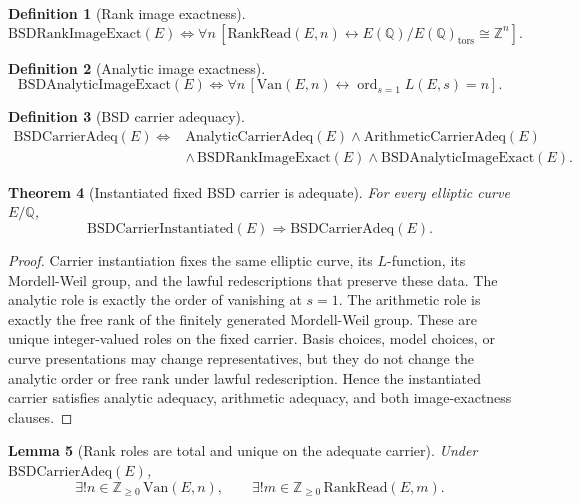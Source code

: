 \documentclass[11pt]{article}
\newtheorem{theorem}{Theorem}[section]
\newtheorem{lemma}[theorem]{Lemma}
\newtheorem{definition}[theorem]{Definition}
\newcommand{\Q}{\mathbb{Q}}
\newcommand{\Z}{\mathbb{Z}}
\newcommand{\ord}{\operatorname{ord}}
\newcommand{\tors}{\operatorname{tors}}
\newcommand{\Van}{\mathrm{Van}}
\newcommand{\RankRead}{\mathrm{RankRead}}
\begin{document}
\begin{definition}[Rank image exactness]
\[
\mathrm{BSDRankImageExact}(E)
\Longleftrightarrow
\forall n\,[\RankRead(E,n)\leftrightarrow E(\Q)/E(\Q)_{\tors}\cong\Z^n].
\]
\end{definition}

\begin{definition}[Analytic image exactness]
\[
\mathrm{BSDAnalyticImageExact}(E)
\Longleftrightarrow
\forall n\,[\Van(E,n)\leftrightarrow \ord_{s=1}L(E,s)=n].
\]
\end{definition}

\begin{definition}[BSD carrier adequacy]
\[
\begin{aligned}
\mathrm{BSDCarrierAdeq}(E) \Longleftrightarrow{}&
\mathrm{AnalyticCarrierAdeq}(E)\wedge
\mathrm{ArithmeticCarrierAdeq}(E)\\
&\wedge\,\mathrm{BSDRankImageExact}(E)
\wedge \mathrm{BSDAnalyticImageExact}(E).
\end{aligned}
\]
\end{definition}

\begin{theorem}[Instantiated fixed BSD carrier is adequate]\label{thm:carrier-adequate}
For every elliptic curve $E/\Q$,
\[
\mathrm{BSDCarrierInstantiated}(E)\Rightarrow \mathrm{BSDCarrierAdeq}(E).
\]
\end{theorem}

\begin{proof}
Carrier instantiation fixes the same elliptic curve, its $L$-function, its Mordell-Weil group, and the lawful redescriptions that preserve these data. The analytic role is exactly the order of vanishing at $s=1$. The arithmetic role is exactly the free rank of the finitely generated Mordell-Weil group. These are unique integer-valued roles on the fixed carrier. Basis choices, model choices, or curve presentations may change representatives, but they do not change the analytic order or free rank under lawful redescription. Hence the instantiated carrier satisfies analytic adequacy, arithmetic adequacy, and both image-exactness clauses.
\end{proof}

\begin{lemma}[Rank roles are total and unique on the adequate carrier]\label{lem:rank-total-unique}
Under $\mathrm{BSDCarrierAdeq}(E)$,
\[
\exists! n\in\Z_{\ge0}\,\Van(E,n),
\qquad
\exists! m\in\Z_{\ge0}\,\RankRead(E,m).
\]
\end{lemma}
\end{document}
